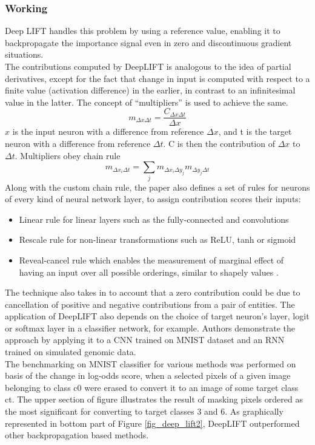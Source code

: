 \documentclass[../report.tex]{subfiles}
\begin{document}
 \subsubsection*{Working}
 Deep LIFT handles this problem by using a reference value, enabling it to backpropagate the importance signal even in zero and discontinuous gradient situations.\\
 The contributions computed by DeepLIFT is analogous to the idea of partial derivatives, except for the fact that change in input is computed with respect to a finite value (activation difference) in the earlier, in contrast to an infinitesimal value in the latter. The concept of \enquote{multipliers} is used to achieve the same.
\begin{equation*}
		m_{\Delta x \Delta t} = \frac{C_{\Delta x \Delta t}}{\Delta x}
\end{equation*}
 $x$ is the input neuron with a difference from reference $\Delta x$, and t is the target neuron with a difference from reference $\Delta t$. C is then the contribution of $\Delta x$ to $\Delta t$.
 Multipliers obey chain rule
\begin{equation*}
	m_{\Delta x_i \Delta t}=\sum_j m_{\Delta x_i \Delta y_j} m_{\Delta y_j \Delta t}
\end{equation*}
 Along with the custom chain rule, the paper also defines a set of rules for neurons of every kind of neural network layer, to assign contribution scores their inputs:
 \begin{itemize}
 	\item Linear rule for linear layers such as the fully-connected and convolutions
 	\item Rescale rule for non-linear transformations such as ReLU, tanh or sigmoid
 	\item Reveal-cancel rule which enables the measurement of marginal effect of having an input over all possible orderings, similar to shapely values \cite{shapley_values}. 
 \end{itemize}
The technique also takes in to account that a zero contribution could be due to cancellation of positive and negative contributions from a pair of entities. The application of DeepLIFT also depends on the choice of target neuron’s layer, logit or softmax layer in a classifier network, for example. Authors demonstrate the approach by applying it to a CNN trained on MNIST dataset \cite{lecun1998gradient} and an RNN trained on simulated genomic data.\\
The benchmarking on MNIST classifier for various methods was performed on basis of the change in log-odds score, when a selected pixels of a given image belonging to class c0 were erased to convert it to an image of some target class ct. The upper section of figure illustrates the result of masking pixels ordered as the most significant for converting to target classes 3 and 6. As graphically represented in bottom part of Figure \ref{fig_deep_lift2}, DeepLIFT outperformed other backpropagation based methods.
\end{document}
